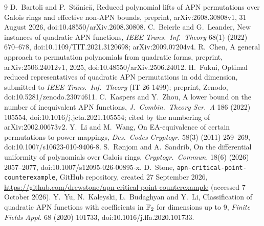 \begin{thebibliography}{9}
 D.~Bartoli and P.~St\u{a}nic\u{a}, Reduced polynomial lifts of APN permutations over Galois rings and effective non-APN bounds, preprint, arXiv:2608.30808v1, 31 August 2026, doi:10.48550/arXiv.2608.30808.
 C.~Beierle and G.~Leander, New instances of quadratic APN functions, \emph{IEEE Trans.\ Inf.\ Theory} 68(1) (2022) 670--678, doi:10.1109/TIT.2021.3120698; arXiv:2009.07204v4.
 R.~Chen, A general approach to permutation polynomials from quadratic forms, preprint, arXiv:2506.24012v1, 2025, doi:10.48550/arXiv.2506.24012.
 H.~Fukui, Optimal reduced representatives of quadratic APN permutations in odd dimension, submitted to \emph{IEEE Trans.\ Inf.\ Theory} (IT-26-1499); preprint, Zenodo, doi:10.5281/zenodo.23074611.
 C.~Kaspers and Y.~Zhou, A lower bound on the number of inequivalent APN functions, \emph{J.\ Combin.\ Theory Ser.~A} 186 (2022) 105554, doi:10.1016/j.jcta.2021.105554; cited by the numbering of arXiv:2002.00673v2.
 Y.~Li and M.~Wang, On EA-equivalence of certain permutations to power mappings, \emph{Des.\ Codes Cryptogr.} 58(3) (2011) 259--269, doi:10.1007/s10623-010-9406-8.
 S.~R{\o}njom and A.~Sandrib, On the differential uniformity of polynomials over Galois rings, \emph{Cryptogr.\ Commun.} 18(6) (2026) 2057--2077, doi:10.1007/s12095-026-00895-x.
 D.~Stone, \texttt{apn-critical-point-counterexample}, GitHub repository, created 27 September 2026, \url{https://github.com/drewstone/apn-critical-point-counterexample} (accessed 7 October 2026).
 Y.~Yu, N.~Kaleyski, L.~Budaghyan and Y.~Li, Classification of quadratic APN functions with coefficients in $\mathbb{F}_2$ for dimensions up to 9, \emph{Finite Fields Appl.} 68 (2020) 101733, doi:10.1016/j.ffa.2020.101733.
\end{thebibliography}
